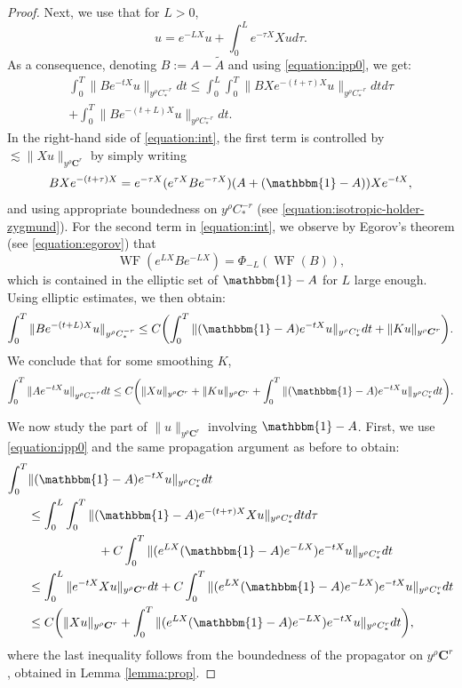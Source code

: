 \documentclass[10pt]{amsart}
\newcommand{\bC}{\boldsymbol{C}}
\DeclareMathOperator{\WF}{WF}
\theoremstyle{plain}
\theoremstyle{definition}
\begin{document}
\begin{proof}
Next, we use that for $L > 0$,
\begin{equation}
\label{equation:ipp0}
u= e^{-LX}u + \int_0^L e^{-\tau X} Xu d\tau.
\end{equation}
As a consequence, denoting $B:=A-\tilde{A}$ and using \eqref{equation:ipp0}, we get:
\begin{multline}
\label{equation:int}
\int_0^T \| B e^{-tX} u\|_{y^\rho C^{-r}_*} dt \leq \int_0^L \int_0^T \| B X e^{-(t+\tau)X}u\|_{y^\rho C^{-r}_*} dt d\tau \\
+ \int_0^T \|B e^{-(t+L)X}u\|_{y^\rho C^{-r}_*} dt.
\end{multline}
In the right-hand side of \eqref{equation:int}, the first term is controlled by $\lesssim \|Xu\|_{y^\rho \bC^r}$ by simply writing
\[
B X e^{-(t+\tau)X} = e^{-\tau X} (e^{\tau X} Be^{-\tau X})(A+(\mathbbm{1}-A)) X e^{-t X},
\]
and using appropriate boundedness on $y^\rho C^{-r}_*$ {\color{black}(see \eqref{equation:isotropic-holder-zygmund})}. For the second term in \eqref{equation:int}, we observe by Egorov's theorem (see \eqref{equation:egorov}) that
\[
\WF(e^{LX} B e^{-LX}) = \Phi_{-L}(\WF(B)),
\]
which is contained in the elliptic set of $\mathbbm{1}-A$ for $L$ large enough. Using elliptic estimates, we then obtain:
\[
\int_0^T \|B e^{-(t+L)X}u\|_{y^\rho C^{-r}_*} \leq C \biggl(\int_0^T \| (\mathbbm{1}-A)e^{-tX}u\|_{y^\rho C^r_*} dt + \| Ku\|_{y^\rho \bC^r}\biggr).
\]
We conclude that for some smoothing $K$,
\begin{equation}
\label{equation:1}
\int_0^T \| A e^{-tX} u\|_{y^\rho C^{-r}_*} dt \leq C \biggl(\| X u\|_{y^\rho \bC^r} + \| K u \|_{y^\rho \bC^r} + \int_0^T \| (\mathbbm{1}-A)e^{-tX} u\|_{y^\rho C^r_*} dt\biggr) .
\end{equation}

We now study the part of $\|u\|_{y^\rho\bC^r}$ involving $\mathbbm{1}-A$. First, we use \eqref{equation:ipp0} and the same propagation argument as before to obtain:
\[\begin{split}
\int_0^T & \| (\mathbbm{1}-A)e^{-tX} u\|_{y^\rho C^r_*} dt \\
& \leq \int_0^L \int_0^T \| (\mathbbm{1}-A) e^{-(t+\tau)X} X u\|_{y^\rho C^{r}_*} dt d\tau \\
&\hspace{2cm} +C \int_0^T \|(e^{LX}(\mathbbm{1}-A)e^{-LX}) e^{-t X}u\|_{y^\rho C^{r}_*} dt \\
& \leq \int_0^L \|e^{-tX}Xu\|_{y^\rho \bC^r} dt + C \int_0^T \|(e^{LX}(\mathbbm{1}-A)e^{-LX}) e^{-t X}u\|_{y^\rho C^{r}_*} dt \\
& \leq C \biggl( \|Xu\|_{y^\rho \bC^r} + \int_0^T \|(e^{LX}(\mathbbm{1}-A)e^{-LX}) e^{-t X}u\|_{y^\rho C^{r}_*} dt \biggr),
\end{split}
\]
where the last inequality follows from the boundedness of the propagator on $y^\rho \bC^r$, obtained in Lemma \ref{lemma:prop}.


\end{proof}
\end{document}
